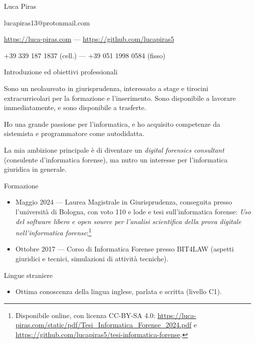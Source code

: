 \documentclass[12pt]{article}
\begin{document}
\pagestyle{empty}

\begin{center}

  {\Huge Luca Piras}

  \vspace{0.616cm}

  lucapiras13@protonmail.com

  \url{https://luca-piras.com} --- \url{https://github.com/lucapiras5}

  +39 339 187 1837 (cell.) --- +39 051 1998 0584 (fisso)

  \vspace{0.616cm}

\end{center}

{\Large Introduzione ed obiettivi professionali}

Sono un neolaureato in giurisprudenza, interessato a stage e tirocini extracurricolari per la formazione e l'inserimento. Sono disponibile a lavorare immediatamente, e sono disponibile a trasferte.

Ho una grande passione per l'informatica, e ho acquisito competenze da sistemista e programmatore come autodidatta.

La mia ambizione principale è di diventare un \textit{digital forensics consultant} (consulente d'informatica forense), ma nutro un interesse per l'informatica giuridica in generale.

{\Large Formazione}

\begin{itemize}
\item Maggio 2024 --- Laurea Magistrale in Giurisprudenza, conseguita presso l'università di Bologna, con voto 110 e lode e tesi sull'informatica forense: \textit{Uso del software libero e open source per l'analisi scientifica della prova digitale nell'informatica forense};\footnote{Disponibile online, con licenza CC-BY-SA 4.0: \url{https://luca-piras.com/static/pdf/Tesi_Informatica_Forense_2024.pdf} e \url{https://github.com/lucapiras5/tesi-informatica-forense}.}
\item Ottobre 2017 --- Corso di Informatica Forense presso BIT4LAW (aspetti giuridici e tecnici, simulazioni di attività tecniche).
\end{itemize}

{\Large Lingue straniere}

\begin{itemize}
\item Ottima conoscenza della lingua inglese, parlata e scritta (livello C1).
\end{itemize}
\end{document}
